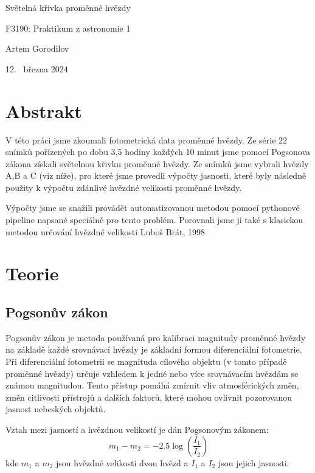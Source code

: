\documentclass[a4paper,11pt]{article}
\begin{document}
\hline
\begin{center}
\bigskip
\huge Světelná křivka proměnné hvězdy
\vspace{0.5cm}
\par \large F3190: Praktikum z astronomie 1
\par \large Artem Gorodilov
\vspace{0.5cm}
\par \large 12. ~března 2024
\bigskip
\end{center}
\hline
\bigskip


\vskip10pt
    \begin{minipage}[t]{0.5\textwidth} 
        \section{Abstrakt}    
            V této práci jsme zkoumali fotometrická data proměnné hvězdy. Ze série 22 snímků pořízených po dobu 3,5 hodiny každých 10 minut jsme pomocí Pogsonova zákona získali světelnou křivku proměnné hvězdy. Ze snímků jsme vybrali hvězdy A,B a C (viz níže), pro které jsme provedli výpočty jasnosti, které byly následně použity k výpočtu zdánlivé hvězdné velikosti proměnné hvězdy. 
            \par Výpočty jsme se snažili provádět automatizovanou metodou pomocí pythonové pipeline napsané speciálně pro tento problém. Porovnali jsme ji také s klasickou metodou určování hvězdné velikosti Luboš Brát, 1998\cite{brat1998}
        \section{Teorie}
            \subsection{Pogsonův zákon}
                \par Pogsonův zákon je metoda používaná pro kalibraci magnitudy proměnné hvězdy na základě každé srovnávací hvězdy je základní formou diferenciální fotometrie. Při diferenciální fotometrii se magnituda cílového objektu (v tomto případě proměnné hvězdy) určuje vzhledem k jedné nebo více srovnávacím hvězdám se známou magnitudou. Tento přístup pomáhá zmírnit vliv atmosférických změn, změn citlivosti přístrojů a dalších faktorů, které mohou ovlivnit pozorovanou jasnost nebeských objektů.
                \par Vztah mezi jasností a hvězdnou velikostí je dán Pogsonovým zákonem:
                \begin{equation}
                    m_1 - m_2 = -2.5 \log \left( \frac{I_1}{I_2} \right)
                \end{equation}
                kde $m_1$ a $m_2$ jsou hvězdné velikosti dvou hvězd a $I_1$ a $I_2$ jsou jejich jasnosti.
    \end{minipage}
\end{document}
